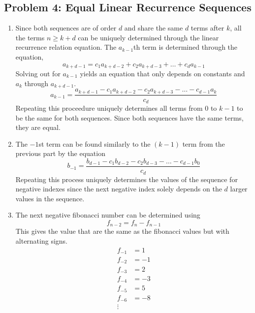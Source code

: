 \documentclass{report}
\begin{document}
\subsection*{Problem 4: Equal Linear Recurrence Sequences}
\begin{enumerate}
    \item Since both sequences are of order $d$ and share the same $d$ terms after $k$,
     all the terms $n \geq k+d$ can be uniquely determined through the linear recurrence relation equation.
    The $a_{k-1}$th term is determined through the equation, 
    \[
        a_{k+d-1} = c_1a_{k+d-2} + c_2a_{k+d-3} + \hdots + c_da_{k-1}
    \] 
    Solving out for $a_{k-1}$ yields an equation that only depends on constants 
    and $a_k$ through $a_{k+d-1}$.
    \[
        a_{k-1} = \frac{a_{k+d-1} - c_1a_{k+d-2} - c_2a_{k+d-3} - \hdots - c_{d-1}a_k}{c_d}
    \]
    Repeating this proceedure uniquely determines all terms from $0$ to $k-1$ to be the same
    for both sequences. Since both sequences have the same terms, they are equal.
    \item The $-1$st term can be found similarly to the $(k-1)$ term 
    from the previous part by the equation 
    \[
        b_{-1} = \frac{b_{d-1} - c_1b_{d-2} - c_2b_{d-3} - \hdots - c_{d-1}b_0}{c_d}
    \]
    Repeating this process uniquely determines the values of the sequence for negative indexes
    since the next negative index solely depends on the $d$ larger values in the sequence.
    \item The next negative fibonacci number can be determined using
    \[
        f_{n-2} = f_{n} - f_{n-1}
    \]
    This gives the value that are the same as the fibonacci values but with alternating signs.
    \begin{align*}
        f_{-1} &= 1 \\
        f_{-2} &= -1 \\
        f_{-3} &= 2 \\
        f_{-4} &= -3 \\
        f_{-5} &= 5 \\
        f_{-6} &= -8 \\
        \vdots
    \end{align*}
\end{enumerate}
\newpage 
\end{document}

